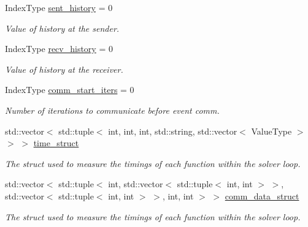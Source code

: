 \begin{DoxyCompactItemize}
Index\+Type \hyperlink{structschwz_1_1Metadata_a2b400902089b06b47f230306b51252d5}{sent\+\_\+history} = 0
\begin{DoxyCompactList}\small\item\em Value of history at the sender. \end{DoxyCompactList}\item 
\mbox{\label{structschwz_1_1Metadata_aa03846a987e8d185f1b35ce3a8155422}} 
Index\+Type \hyperlink{structschwz_1_1Metadata_aa03846a987e8d185f1b35ce3a8155422}{recv\+\_\+history} = 0
\begin{DoxyCompactList}\small\item\em Value of history at the receiver. \end{DoxyCompactList}\item 
\mbox{\label{structschwz_1_1Metadata_a716f809953505b19e0f1d9398c167bd4}} 
Index\+Type \hyperlink{structschwz_1_1Metadata_a716f809953505b19e0f1d9398c167bd4}{comm\+\_\+start\+\_\+iters} = 0
\begin{DoxyCompactList}\small\item\em Number of iterations to communicate before event comm. \end{DoxyCompactList}\item 
\mbox{\label{structschwz_1_1Metadata_a50bb2b3dc28c0eabbd423a069e560951}} 
std\+::vector$<$ std\+::tuple$<$ int, int, int, std\+::string, std\+::vector$<$ Value\+Type $>$ $>$ $>$ \hyperlink{structschwz_1_1Metadata_a50bb2b3dc28c0eabbd423a069e560951}{time\+\_\+struct}
\begin{DoxyCompactList}\small\item\em The struct used to measure the timings of each function within the solver loop. \end{DoxyCompactList}\item 
\mbox{\label{structschwz_1_1Metadata_a54f774e70eb42b84f63f702262b99fa6}} 
std\+::vector$<$ std\+::tuple$<$ int, std\+::vector$<$ std\+::tuple$<$ int, int $>$ $>$, std\+::vector$<$ std\+::tuple$<$ int, int $>$ $>$, int, int $>$ $>$ \hyperlink{structschwz_1_1Metadata_a54f774e70eb42b84f63f702262b99fa6}{comm\+\_\+data\+\_\+struct}
\begin{DoxyCompactList}\small\item\em The struct used to measure the timings of each function within the solver loop. \end{DoxyCompactList}\item 

\end{DoxyCompactItemize}
